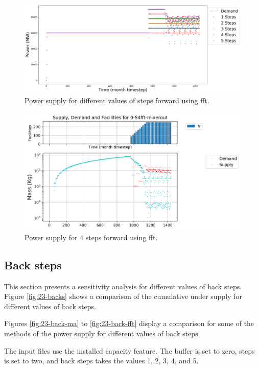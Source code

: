 \documentclass[11pt]{article}
\begin{document}
\begin{figure}[H]
	\centering
	\includegraphics[width=\textwidth]{23-figures/23-power-buffer0-fft-steps.png} 
	\hfill
	\caption{Power supply for different values of steps forward using fft.}
	\label{fig:23-ste-fft}
\end{figure}

\begin{figure}[H]
	\centering
	\includegraphics[width=\textwidth]{23-figures/0-S4-fft-mixerout.png} 
	\hfill
	\caption{Power supply for 4 steps forward using fft.}
	\label{fig:23-ste-fft-mixerout}
\end{figure}

\subsection{Back steps}

This section presents a sensitivity analysis for different values of  back steps. Figure \ref{fig:23-backs} shows a comparison of the cumulative under supply for different values of back steps.

Figures \ref{fig:23-back-ma} to \ref{fig:23-back-fft} display a comparison for some of the methods of the power supply for different values of back steps.

The input files use the installed capacity feature. The buffer is set to zero, steps is set to two, and back steps takes the values 1, 2, 3, 4, and 5.
\end{document}

